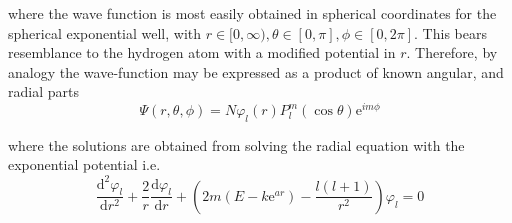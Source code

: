 \documentclass[../main.tex]{subfiles}
\begin{document}
where the wave function is most easily obtained in spherical coordinates for the spherical exponential well, with $r \in [0, \infty), \theta \in [0, \pi], \phi \in [0, 2\pi]$. This bears resemblance to the hydrogen atom with a modified potential in $r$. Therefore, by analogy the wave-function may be expressed as a product of known angular, and radial parts
\begin{equation}
\Psi(r, \theta, \phi) = N \varphi_{l}(r) P_l^m(\cos\theta) \text{e}^{im\phi} 
\end{equation}

where the solutions are obtained from solving the radial equation with the exponential potential i.e.
\begin{equation}
\frac{\text{d}^2\varphi_l}{\text{d} r^2} + \frac{2}{r} \frac{\text{d}\varphi_l}{\text{d}r} + \left(2m\left(E - k\text{e}^{ar}\right) - \frac{l(l+1)}{r^2}\right)\varphi_l = 0
\label{3d_exp_well_radial}
\end{equation}
\end{document}

